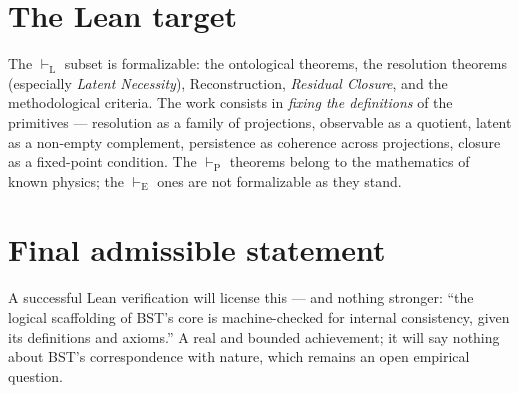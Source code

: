 \documentclass[11pt]{book}
\begin{document}
\section{The Lean target}
The $\vdash_{\mathrm{L}}$ subset is formalizable: the ontological theorems, the resolution theorems (especially \emph{Latent Necessity}), Reconstruction, \emph{Residual Closure}, and the methodological criteria. The work consists in \emph{fixing the definitions} of the primitives --- resolution as a family of projections, observable as a quotient, latent as a non-empty complement, persistence as coherence across projections, closure as a fixed-point condition. The $\vdash_{\mathrm{P}}$ theorems belong to the mathematics of known physics; the $\vdash_{\mathrm{E}}$ ones are not formalizable as they stand.

\section{Final admissible statement}
A successful Lean verification will license this --- and nothing stronger: ``the logical scaffolding of BST's core is machine-checked for internal consistency, given its definitions and axioms.'' A real and bounded achievement; it will say nothing about BST's correspondence with nature, which remains an open empirical question.
\end{document}
